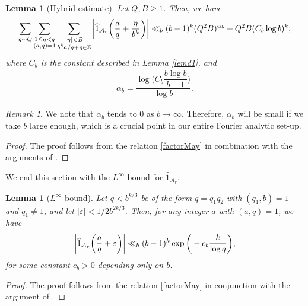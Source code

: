 \documentclass[12pt]{amsart}
\numberwithin{equation}{section}
\newtheorem{lemma}[theorem]{Lemma}
\theoremstyle{remark}
\newtheorem*{remark}{Remark}
\theoremstyle{definition}
\begin{document}
\begin{lemma}[Hybrid estimate]\label{lemd2} Let $Q, B \geq 1$. Then, we have 
\begin{align}
\notag \sum_{q\sim Q}\sum_{\substack{1\leq a<q\\(a, q)=1}}\sum_{\substack{|\eta|<B\\b^k a/q + \eta \in \mathbb{Z}}}\bigg|\widehat{1}_{\mathcal{A}_r}\bigg(\frac{a}{q} + \frac{\eta}{b^k}\bigg)\bigg| \ll_{b} (b-1)^k(Q^2B)^{\alpha_b} + Q^2B(C_b\log b)^k,
\end{align}
where $C_b$ is the constant described in Lemma \ref{lemd1}, and
\begin{align}
\label{alphab} \alpha_b = \dfrac{\log \bigg(C_b\dfrac{b\log b}{b-1}\bigg)}{\log b}.
\end{align}
\end{lemma}
\begin{remark}
We note that $\alpha_b$ tends to $0$ as $b\rightarrow \infty$. Therefore, $\alpha_b$ will be small if we take $b$ large enough, which is a crucial point in our entire Fourier analytic set-up.
\end{remark}
\begin{proof}
The proof follows from the relation \eqref{factorMay} in combination with the arguments of \cite[Lemma 5.3]{May2}. 
\end{proof}






We end this section with the $L^\infty$ bound for $\widehat{1}_{\mathcal{A}_r}$.
\begin{lemma}[$L^\infty$ bound]\label{lemd3}
Let $q<b^{k/3}$ be of the form $q=q_1q_2$ with $(q_1, b)=1$ and $q_1\neq 1$, and let $|\varepsilon| < 1/2b^{2k/3}$. Then, for any integer $a$ with $(a, q)=1$, we have
\begin{align}
\notag \bigg|\widehat{1}_{\mathcal{A}_r}\bigg(\frac{a}{q}+\varepsilon\bigg)\bigg| \ll_{b} (b-1)^k\exp\bigg(-c_b\dfrac{k}{\log q}\bigg),
\end{align}
for some constant $c_b>0$ depending only on $b$.
\end{lemma}
\begin{proof}
The proof follows from the relation \eqref{factorMay} in conjunction with the argument of \cite[Lemma 5.4]{May2}.
\end{proof}
\end{document}
